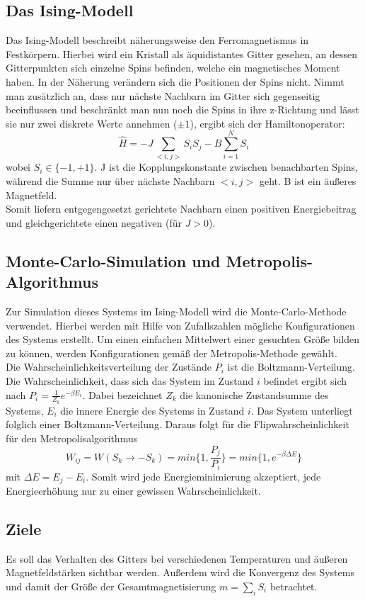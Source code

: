 \subsection{Das Ising-Modell}

Das Ising-Modell beschreibt näherungsweise den Ferromagnetismus in Festkörpern. Hierbei wird ein Kristall als äquidistantes Gitter gesehen, an dessen Gitterpunkten sich einzelne Spins befinden, welche ein magnetisches Moment haben. In der Näherung verändern sich die Positionen der Spins nicht. Nimmt man zusätzlich an, dass nur nächste Nachbarn im Gitter sich gegenseitig beeinflussen und beschränkt man nun noch die Spins in ihre z-Richtung und lässt sie nur zwei diskrete Werte annehmen ($\pm1$), ergibt sich der Hamiltonoperator:\\
\[
\hat{H}=-J\sum_{<i,j>} S_i S_j - B\sum_{i=1}^N S_i
\]
wobei $S_i \in \{-1,+1\}$. J ist die Kopplungskonstante zwischen benachbarten Spins, während die Summe nur über nächste Nachbarn $<i,j>$ geht. B ist ein äußeres Magnetfeld.\\
Somit liefern entgegengesetzt gerichtete Nachbarn einen positiven Energiebeitrag und gleichgerichtete einen negativen (für $J>0$).\\

\subsection{Monte-Carlo-Simulation und Metropolis-Algorithmus}
\label{theo2}
Zur Simulation dieses Systems im Ising-Modell wird die Monte-Carlo-Methode verwendet. Hierbei werden mit Hilfe von Zufallszahlen mögliche Konfigurationen des Systems erstellt. Um einen einfachen Mittelwert einer gesuchten Größe bilden zu können, werden Konfigurationen gemäß der Metropolis-Methode gewählt.\\
Die Wahrscheinlichkeitsverteilung der Zustände $P_i$ ist die Boltzmann-Verteilung. Die Wahrscheinlichkeit, dass sich das System im Zustand $i$ befindet ergibt sich nach $P_{i}=\frac{1}{Z_{k}} e^{-\beta E_{i}}$. Dabei bezeichnet $Z_{k}$ die kanonische Zustandsumme des Systems, $E_{i}$ die innere Energie des Systems in Zustand $i$. Das System unterliegt folglich einer Boltzmann-Verteilung. Daraus folgt für die Flipwahrscheinlichkeit für den Metropolisalgorithmus
\begin{equation}
W_{ij}=W(S_k \rightarrow -S_k)=min\{1,\frac{P_{j}}{P_{i}}\}=min\{1,e^{-\beta \Delta E}\}
\end{equation}
mit $\Delta E=E_{j}-E_{i}$. Somit wird jede Energieminimierung akzeptiert, jede Energieerhöhung nur zu einer gewissen Wahrscheinlichkeit.


\subsection{Ziele}

Es soll das Verhalten des Gitters bei verschiedenen Temperaturen und äußeren Magnetfeldstärken sichtbar werden. Außerdem wird die Konvergenz des Systems und damit der Größe der Gesamtmagnetisierung $m=\sum_i S_i$ betrachtet.
